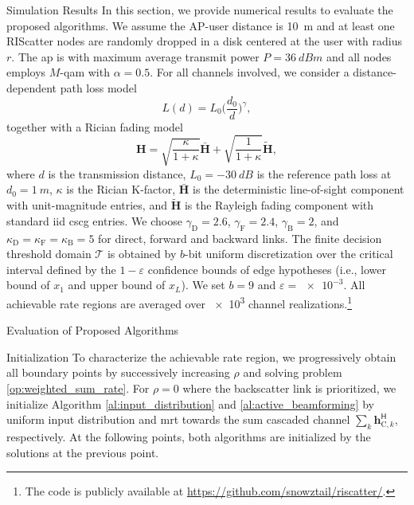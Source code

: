 \begin{section}{Simulation Results}
	\label{sc:simulation_results}
	In this section, we provide numerical results to evaluate the proposed algorithms.
	We assume the AP-user distance is \qty{10}{m} and at least one RIScatter nodes are randomly dropped in a disk centered at the user with radius $r$.
	The \gls{ap} is with maximum average transmit power $P=\qty{36}{dBm}$ and all nodes employs $M$-\gls{qam} with $\alpha=0.5$.
	For all channels involved, we consider a distance-dependent path loss model
	\begin{equation}
		L(d) = L_0 \biggl(\frac{d_0}{d}\biggr)^\gamma,
	\end{equation}
	together with a Rician fading model
	\begin{equation}
		\boldsymbol{H} = \sqrt{\frac{\kappa}{1+\kappa}} \bar{\boldsymbol{H}} + \sqrt{\frac{1}{1+\kappa}} \tilde{\boldsymbol{H}},
	\end{equation}
	where $d$ is the transmission distance, $L_0=-\qty{30}{dB}$ is the reference path loss at $d_0=\qty{1}{m}$, $\kappa$ is the Rician K-factor, $\bar{\boldsymbol{H}}$ is the deterministic line-of-sight component with unit-magnitude entries, and $\tilde{\boldsymbol{H}}$ is the Rayleigh fading component with standard \gls{iid} \gls{cscg} entries.
	We choose $\gamma_{\text{D}}=2.6$, $\gamma_{\text{F}}=2.4$, $\gamma_{\text{B}}=2$, and $\kappa_{\text{D}}=\kappa_{\text{F}}=\kappa_{\text{B}}=5$ for direct, forward and backward links.
	The finite decision threshold domain $\mathcal{T}$ is obtained by $b$-bit uniform discretization over the critical interval defined by the $1-\varepsilon$ confidence bounds of edge hypotheses (i.e., lower bound of $x_1$ and upper bound of $x_L$).
	We set $b=9$ and $\varepsilon=\num{e-3}$.
	All achievable rate regions are averaged over \num{e3} channel realizations.\footnote{The code is publicly available at \url{https://github.com/snowztail/riscatter/}.}

	\begin{subsection}{Evaluation of Proposed Algorithms}
		\begin{subsubsection}{Initialization}
			To characterize the achievable rate region, we progressively obtain all boundary points by successively increasing $\rho$ and solving problem \eqref{op:weighted_sum_rate}.
			For $\rho=0$ where the backscatter link is prioritized, we initialize Algorithm \ref{al:input_distribution} and \ref{al:active_beamforming} by uniform input distribution and \gls{mrt} towards the sum cascaded channel $\sum_{k} \boldsymbol{h}_{\text{C},k}^\mathsf{H}$, respectively.
			At the following points, both algorithms are initialized by the solutions at the previous point.
		\end{subsubsection}


\end{subsection}
\end{section}
